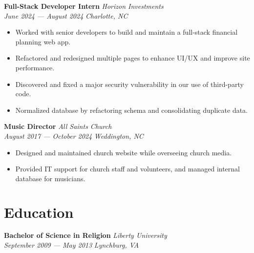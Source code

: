 \documentclass[letterpaper, 11pt]{article}
\begin{document}
\noindent
\textbf{Full-Stack Developer Intern}
\hfill \textit{Horizon Investments} \\
\textit{June 2024 — August 2024}
\hfill \textit{Charlotte, NC}
\begin{itemize}
\item Worked with senior developers to build and maintain a full-stack
  financial planning web app.
\item Refactored and redesigned multiple pages to enhance UI/UX and
  improve site performance.
\item Discovered and fixed a major security vulnerability in our use
  of third-party code.
\item Normalized database by refactoring schema and consolidating
  duplicate data.
\end{itemize}

\noindent
\textbf{Music Director}
\hfill \textit{All Saints Church} \\
\textit{August 2017 — October 2024}
\hfill \textit{Weddington, NC}
\begin{itemize}
\item Designed and maintained church website while overseeing church media.
\item Provided IT support for church staff and volunteers, and managed
  internal database for musicians.
\end{itemize}


\section*{Education}
\textbf{Bachelor of Science in Religion}
\hfill \textit{Liberty University} \\
\textit{September 2009 — May 2013}
\hfill \textit{Lynchburg, VA}
\end{document}
